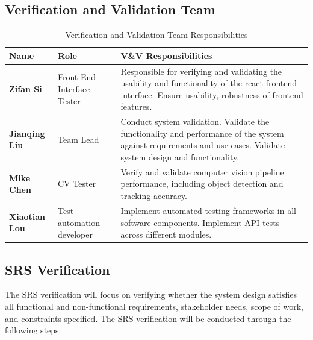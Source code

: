 \documentclass[12pt, titlepage]{article}
\begin{document}
\subsection{Verification and Validation Team}

\begin{table}[H]
  \centering
  \caption{Verification and Validation Team Responsibilities}
  \label{tab:vnv_team}
  \begin{tabular}{|p{3.5cm}|p{3.5cm}|p{8cm}|}
    \hline
    \textbf{Name}         & \textbf{Role}              & \textbf{V\&V Responsibilities} \\ \hline

    \textbf{Zifan Si}     & Front End Interface Tester &
    Responsible for verifying and validating the usability and functionality of the
    react frontend interface.
    Ensure usability, robustness of frontend features.                                  \\ \hline

    \textbf{Jianqing Liu} & Team Lead                  &
    Conduct system validation. Validate the functionality and
    performance of the system against requirements and use cases. Validate system
    design and functionality.                                                           \\ \hline

    \textbf{Mike Chen}    & CV Tester                  &
    Verify and validate computer vision pipeline performance, including object detection
    and tracking accuracy.                                                              \\ \hline

    \textbf{Xiaotian Lou} & Test automation developer  &
    Implement automated testing frameworks in all software components. Implement
    API tests across different modules.
    \\ \hline

  \end{tabular}
\end{table}

\subsection{SRS Verification}

The SRS verification will focus on verifying whether the system design
satisfies all functional and non-functional requirements, stakeholder needs,
scope of work, and constraints specified. The SRS verification will be
conducted through the following steps:
\end{document}

